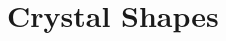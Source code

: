 \documentclass[compress]{beamer}
\begin{document}
\begin{frame}[fragile]
\begin{columns}
\begin{column}{5cm}
\end{column}

\end{columns}
\end{frame}


\section{Crystal Shapes}
\label{sec:crystalShapes}
\end{document}
